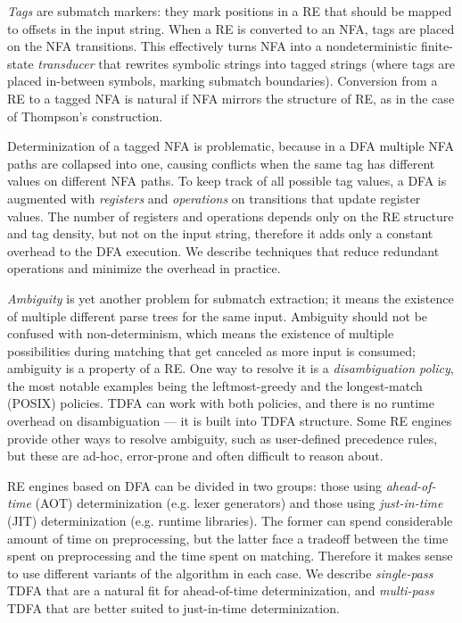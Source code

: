 \documentclass[]{article}
\begin{document}
\emph{Tags} are submatch markers: they mark positions in a RE that should be mapped to offsets in the input string.
When a RE is converted to an NFA, tags are placed on the NFA transitions.
This effectively turns NFA into a nondeterministic finite-state \emph{transducer}
that rewrites symbolic strings into tagged strings (where tags are placed in-between symbols, marking submatch boundaries).
Conversion from a RE to a tagged NFA is natural if NFA mirrors the structure of RE, as in the case of Thompson's construction.
\medskip

Determinization of a tagged NFA is problematic, because in a DFA multiple NFA paths are collapsed into one,
causing conflicts when the same tag has different values on different NFA paths.
To keep track of all possible tag values, a DFA is augmented with \emph{registers}
and \emph{operations} on transitions that update register values.
The number of registers and operations depends only on the RE structure and tag density,
but not on the input string,
therefore it adds only a constant overhead to the DFA execution.
We describe techniques that reduce redundant operations and minimize the overhead in practice.
\medskip

\emph{Ambiguity} is yet another problem for submatch extraction;
it means the existence of multiple different parse trees for the same input.
Ambiguity should not be confused with non-determinism,
which means the existence of multiple possibilities during matching that get canceled as more input is consumed;
ambiguity is a property of a RE.
%
One way to resolve it is a \emph{disambiguation policy},
the most notable examples being the leftmost-greedy and the longest-match (POSIX) policies.
TDFA can work with both policies, and there is no runtime overhead on disambiguation --- it is built into TDFA structure.
Some RE engines provide other ways to resolve ambiguity, such as user-defined precedence rules,
but these are ad-hoc, error-prone and often difficult to reason about.
\medskip

RE engines based on DFA can be divided in two groups:
those using \emph{ahead-of-time} (AOT) determinization (e.g. lexer generators)
and those using \emph{just-in-time} (JIT) determinization (e.g. runtime libraries).
The former can spend considerable amount of time on preprocessing,
but the latter face a tradeoff between the time spent on preprocessing and the time spent on matching.
Therefore it makes sense to use different variants of the algorithm in each case.
We describe \emph{single-pass} TDFA that are a natural fit for ahead-of-time determinization,
and \emph{multi-pass} TDFA that are better suited to just-in-time determinization.
\medskip
\end{document}
